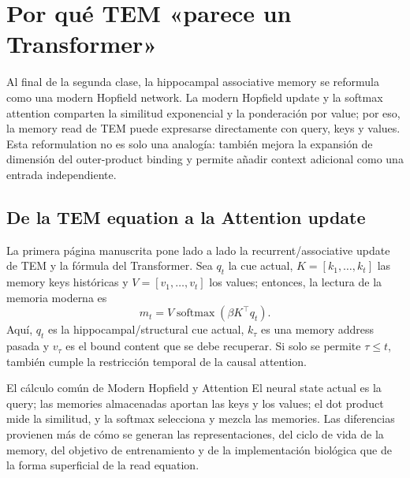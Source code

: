\section{Por qué TEM «parece un Transformer»}

Al final de la segunda clase, la hippocampal associative memory se reformula como una modern Hopfield network. La modern Hopfield update y la softmax attention comparten la similitud exponencial y la ponderación por value; por eso, la memory read de TEM puede expresarse directamente con query, keys y values. Esta reformulation no es solo una analogía: también mejora la expansión de dimensión del outer-product binding y permite añadir context adicional como una entrada independiente.

\subsection{De la TEM equation a la Attention update}

La primera página manuscrita pone lado a lado la recurrent/associative update de TEM y la fórmula del Transformer. Sea $q_t$ la cue actual, $K=[k_1,\ldots,k_t]$ las memory keys históricas y $V=[v_1,\ldots,v_t]$ los values; entonces, la lectura de la memoria moderna es
$$
m_t=V\operatorname{softmax}(\beta K^{\top}q_t).
$$
Aquí, $q_t$ es la hippocampal/structural cue actual, $k_\tau$ es una memory address pasada y $v_\tau$ es el bound content que se debe recuperar. Si solo se permite $\tau\le t$, también cumple la restricción temporal de la causal attention.



\begin{importantbox}{El cálculo común de Modern Hopfield y Attention}
El neural state actual es la query; las memories almacenadas aportan las keys y los values; el dot product mide la similitud, y la softmax selecciona y mezcla las memories. Las diferencias provienen más de cómo se generan las representaciones, del ciclo de vida de la memory, del objetivo de entrenamiento y de la implementación biológica que de la forma superficial de la read equation.
\end{importantbox}

